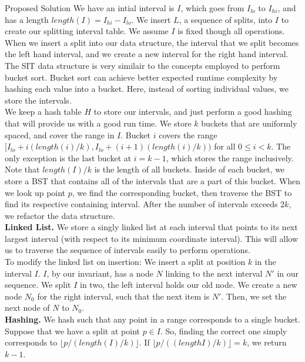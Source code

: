 \documentclass[11pt]{article}
\begin{document}
\begin{section}{Proposed Solution}
We have an intial interval is $I$, which goes from $I_{lo}$ to $I_{hi}$, and has a length $length(I) = I_{hi} - I_{lo}$. We insert $L$, a sequence of splits, into $I$ to create our splitting interval table. We assume $I$ is fixed though all operations. When we insert a split into our data structure, the interval that we split becomes the left hand interval, and we create a new interval for the right hand interval.\\

The SIT data structure is very similair to the concepts employed to perform bucket sort. Bucket sort can achieve better expected runtime complexity by hashing each value into a bucket. Here, instead of sorting individual values, we store the intervals.\\

We keep a hash table $H$ to store our intervals, and just perform a good hashing that will provide us with a good run time. We store $k$ buckets that are uniformly spaced, and cover the range in $I$. Bucket $i$ covers the range $[I_{lo} + i (length(i)/k), I_{lo} + (i+1) (length(i)/k))$ for all $0 \le i < k$. The only exception is the last bucket at $i = k-1$, which stores the range inclusively. Note that $length(I) / k$ is the length of all buckets. Inside of each bucket, we store a BST that contains all of the intervals that are a part of this bucket. When we look up point $p$, we find the corresponding bucket, then traverse the BST to find its respective containing interval. After the number of intervals exceeds $2k$, we refactor the data structure.\\

\textbf{Linked List.} We store a singly linked list at each interval that points to its next largest interval (with respect to its minimum coordinate interval). This will allow us to traverse the sequence of intervals easily to perform operations. \\

To modify the linked list on insertion: We insert a split at position $k$ in the interval $I$. $I$, by our invariant, has a node $N$ linking to the next interval $N'$ in our sequence. We split $I$ in two, the left interval holds our old node. We create a new node $N_0$ for the right interval, such that the next item is $N'$. Then, we set the next node of $N$ to $N_0$. \\ 

\textbf{Hashing.} We hash such that any point in a range corresponds to a single bucket. Suppose that we have a split at point $p \in I$. So, finding the correct one simply corresponds to $\lfloor p  / (length(I) / k) \rfloor$. If $\lfloor p / ((length I) / k) \rfloor = k$, we return $k - 1$.\\


\end{section}
\end{document}
